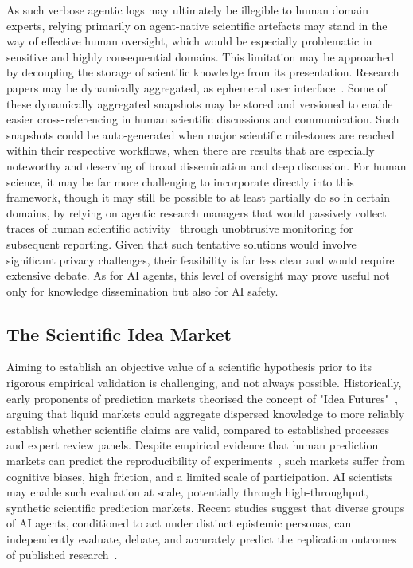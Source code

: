 \documentclass[11pt, a4paper, twocolumn, goog]{google}
\begin{document}
As such verbose agentic logs may ultimately be illegible to human domain experts, relying primarily on agent-native scientific artefacts may stand in the way of effective human oversight, which would be especially problematic in sensitive and highly consequential domains. This limitation may be approached by decoupling the storage of scientific knowledge from its presentation. Research papers may be dynamically aggregated, as ephemeral user interface~\citep{head2021augmenting, harper2024futurescientificpublishingautomated, aspuru2025commit}. Some of these dynamically aggregated snapshots may be stored and versioned to enable easier cross-referencing in human scientific discussions and communication. Such snapshots could be auto-generated when major scientific milestones are reached within their respective workflows, when there are results that are especially noteworthy and deserving of broad dissemination and deep discussion. For human science, it may be far more challenging to incorporate directly into this framework, though it may still be possible to at least partially do so in certain domains, by relying on agentic research managers that would passively collect traces of human scientific activity~\citep{redyuk2019automated, higgins2022considerations} through unobtrusive monitoring for subsequent reporting. Given that such tentative solutions would involve significant privacy challenges, their feasibility is far less clear and would require extensive debate. As for AI agents, this level of oversight may prove useful not only for knowledge dissemination but also for AI safety.

\subsection{The Scientific Idea Market}

Aiming to establish an objective value of a scientific hypothesis prior to its rigorous empirical validation is challenging, and not always possible. Historically, early proponents of prediction markets theorised the concept of "Idea Futures"~\citep{hanson1995could}, arguing that liquid markets could aggregate dispersed knowledge to more reliably establish whether scientific claims are valid, compared to established processes and expert review panels. Despite empirical evidence that human prediction markets can predict the reproducibility of experiments~\citep{altmejd2019predicting, dreber2015using}, such markets suffer from cognitive biases, high friction, and a limited scale of participation. AI scientists may enable such evaluation at scale, potentially through high-throughput, synthetic scientific prediction markets. Recent studies suggest that diverse groups of AI agents, conditioned to act under distinct epistemic personas, can independently evaluate, debate, and accurately predict the replication outcomes of published research~\citep{rajtmajer2022synthetic}.
\end{document}
